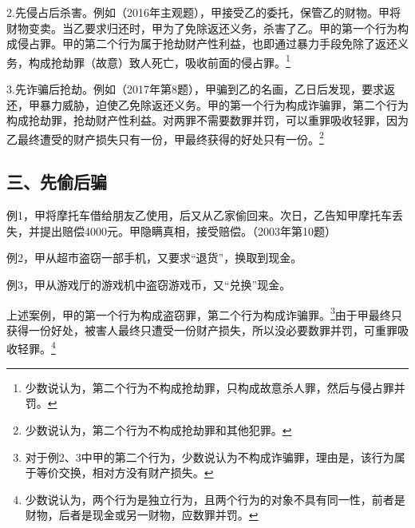 2.先侵占后杀害。例如（2016年主观题），甲接受乙的委托，保管乙的财物。甲将财物变卖。当乙要求归还时，甲为了免除返还义务，杀害了乙。甲的第一个行为构成侵占罪。甲的第二个行为属于抢劫财产性利益，也即通过暴力手段免除了返还义务，构成抢劫罪（故意）致人死亡，吸收前面的侵占罪。\footnote{少数说认为，第二个行为不构成抢劫罪，只构成故意杀人罪，然后与侵占罪并罚。}

3.先诈骗后抢劫。例如（2017年第8题），甲骗到乙的名画，乙日后发现，要求返还，甲暴力威胁，迫使乙免除返还义务。甲的第一个行为构成诈骗罪，第二个行为构成抢劫罪，抢劫财产性利益。对两罪不需要数罪并罚，可以重罪吸收轻罪，因为乙最终遭受的财产损失只有一份，甲最终获得的好处只有一份。\footnote{少数说认为，第二个行为不构成抢劫罪和其他犯罪。}

\subsection*{三、先偷后骗}

例1，甲将摩托车借给朋友乙使用，后又从乙家偷回来。次日，乙告知甲摩托车丢失，并提出赔偿4000元。甲隐瞒真相，接受赔偿。（2003年第10题）

例2，甲从超市盗窃一部手机，又要求“退货”，换取到现金。

例3，甲从游戏厅的游戏机中盗窃游戏币，又“兑换”现金。

上述案例，甲的第一个行为构成盗窃罪，第二个行为构成诈骗罪。\footnote{对于例2、3中甲的第二个行为，少数说认为不构成诈骗罪，理由是，该行为属于等价交换，相对方没有财产损失。}由于甲最终只获得一份好处，被害人最终只遭受一份财产损失，所以没必要数罪并罚，可重罪吸收轻罪。\footnote{少数说认为，两个行为是独立行为，且两个行为的对象不具有同一性，前者是财物，后者是现金或另一财物，应数罪并罚。}

